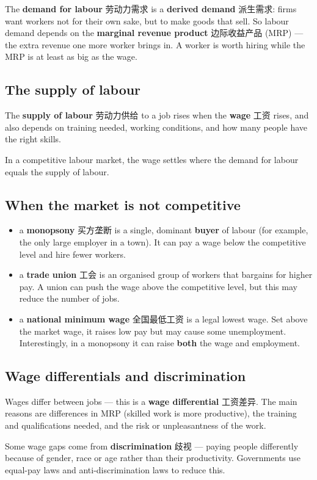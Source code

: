 \documentclass[11pt]{article}
\begin{document}
The \textbf{demand for labour} 劳动力需求 is a \textbf{derived demand} 派生需求: firms want workers not for their own sake, but to make goods that sell. So labour demand depends on the \textbf{marginal revenue product} 边际收益产品 (MRP) — the extra revenue one more worker brings in. A worker is worth hiring while the MRP is at least as big as the wage.

\subsection*{The supply of labour}

The \textbf{supply of labour} 劳动力供给 to a job rises when the \textbf{wage} 工资 rises, and also depends on training needed, working conditions, and how many people have the right skills.

In a competitive labour market, the wage settles where the demand for labour equals the supply of labour.

\subsection*{When the market is not competitive}

\begin{itemize}
\item a \textbf{monopsony} 买方垄断 is a single, dominant \textbf{buyer} of labour (for example, the only large employer in a town). It can pay a wage below the competitive level and hire fewer workers.

\item a \textbf{trade union} 工会 is an organised group of workers that bargains for higher pay. A union can push the wage above the competitive level, but this may reduce the number of jobs.

\item a \textbf{national minimum wage} 全国最低工资 is a legal lowest wage. Set above the market wage, it raises low pay but may cause some unemployment. Interestingly, in a monopsony it can raise \textbf{both} the wage and employment.

\end{itemize}

\subsection*{Wage differentials and discrimination}

Wages differ between jobs — this is a \textbf{wage differential} 工资差异. The main reasons are differences in MRP (skilled work is more productive), the training and qualifications needed, and the risk or unpleasantness of the work.

Some wage gaps come from \textbf{discrimination} 歧视 — paying people differently because of gender, race or age rather than their productivity. Governments use equal-pay laws and anti-discrimination laws to reduce this.
\end{document}
